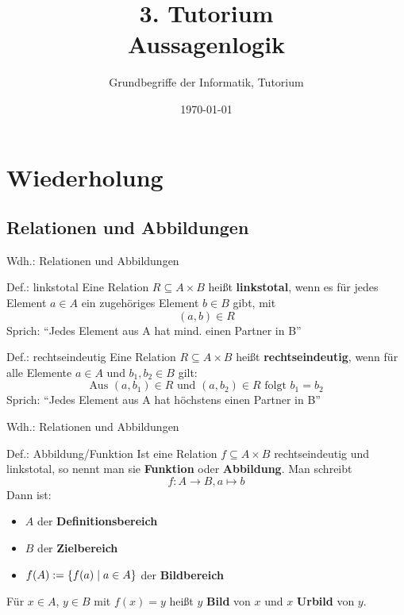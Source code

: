 




\title[Aussagenlogik]{3. Tutorium\\ Aussagenlogik}
\subtitle{Grundbegriffe der Informatik, Tutorium \hashtag\mytutnumber}
\date{\today}
\usepackage{tikz}


\titleframe
\roadmap

\section{Wiederholung}
\subsection{Relationen und Abbildungen}
\begin{frame}{Wdh.: Relationen und Abbildungen}
	\begin{block}{Def.: linkstotal}
	\pause
		Eine Relation $R \subseteq A \times B$ heißt \textbf{linkstotal}, wenn es für jedes Element $a \in A$ ein zugehöriges Element $b \in B$ gibt, mit $$(a,b) \in R$$
		Sprich: \enquote{Jedes Element aus A hat mind. einen Partner in B}
	\end{block}
	\pause
	\begin{block}{Def.: rechtseindeutig}
	\pause
		Eine Relation $R \subseteq A \times B$ heißt \textbf{rechtseindeutig}, wenn für alle Elemente $a \in A$ und $b_1, b_2 \in B$ gilt: $$\text{Aus }(a,b_1) \in R \text{ und } (a,b_2) \in R \text{ folgt }  b_1 = b_2$$
		Sprich: \enquote{Jedes Element aus A hat höchstens einen Partner in B}
	\end{block}
\end{frame}

\begin{frame}{Wdh.: Relationen und Abbildungen}
	\begin{block}{Def.: Abbildung/Funktion}
		Ist eine Relation $f \subseteq A \times B$ rechtseindeutig und linkstotal, so nennt man sie \textbf{Funktion} oder \textbf{Abbildung}. 
		Man schreibt
		\[
			f : A \to B, a \mapsto b %
		\]
		\pause
		Dann ist:
		\begin{itemize}
			\item \(A\) der \textbf{Definitionsbereich}
			\item \(B\) der \textbf{Zielbereich}
			\item \(f(A) := \left\{ f(a) \mid a \in A \right\}\) der \textbf{Bildbereich}
		\end{itemize}
		Für \(x \in A\), \(y \in B\) mit \(f(x)=y\) heißt \(y\) \textbf{Bild} von \(x\) und \(x\) \textbf{Urbild} von \(y\).
	\end{block}
\end{frame}

